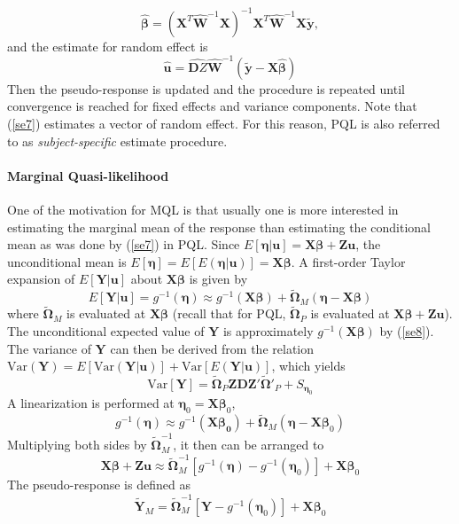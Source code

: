 		\begin{equation}
		\hat{\bm\beta} = (\bm X^T\hat{\bm W}^{-1} \bm X)^{-1}\bm X^T\hat{\bm W}^{-1}\bm X \tilde{\bm y},
		\end{equation}
		and the estimate for random effect is 
		\begin{equation}\label{se7}
		\hat{\bm u} = \hat{\bm DZ} \hat{\bm W}^{-1} (\tilde{\bm y}-\bm {X} \hat{\bm \beta})
		\end{equation}
		Then the pseudo-response is updated and the procedure is repeated until convergence is reached for fixed effects and variance components.  Note that (\ref{se7}) estimates a vector of random effect. For this reason, PQL is also referred to as \textit{subject-specific} estimate procedure. 
		
		\paragraph{Marginal Quasi-likelihood} 
		One of the motivation for MQL is that usually one is more interested in estimating the marginal mean of the response than estimating the conditional mean as was done by (\ref{se7}) in PQL. Since $E[\bm \eta|\bm u]= \bm {X\beta} + \bm {Zu}$, the unconditional mean is $E[\bm \eta] = E[E(\bm \eta|\bm u)]= \bm {X\beta}$. A first-order Taylor expansion of $E[\bm Y|\bm u]$ about $\bm X \bm\beta$ is given by 
		\begin{equation}\label{se8}
		E[\bm Y|\bm u] = g^{-1}(\bm \eta) \approx g^{-1} (\bm{X\beta}) + \tilde{\bm \Omega}_{M} (\bm \eta - \bm X\bm \beta)
		\end{equation}
		where $\tilde{\bm \Omega}_{M}$ is evaluated at $\bm {X\beta}$ (recall that for PQL, $\tilde{\bm \Omega}_P$ is evaluated at $\bm {X\beta} + \bm {Zu}$). The unconditional expected value of  $\bm Y$ is approximately $g^{-1}(\bm {X\beta})$ by (\ref{se8}). The variance of $\bm Y$ can then be derived from the relation $\text{Var}(\bm Y)= E[\text{Var}(\bm Y|\bm u)] + \text{Var}[E(\bm Y| \bm u)]$, which yields
		\begin{equation}\label{se9}
		\text{Var}[\bm Y] = \tilde{\bm \Omega}_P \bm {ZDZ'}\tilde{\bm \Omega}'_P + S_{\bm \eta_0}
		\end{equation}
		A linearization is performed at $\bm \eta_0= \bm X \bm \beta_0$, 
		\[ g^{-1}(\bm \eta) \approx g^{-1} (\bm{X\beta_0}) + \tilde{\bm \Omega}_{M} (\bm \eta - \bm X\bm \beta_0)\]
		Multiplying both sides by $\tilde{\bm \Omega}_{M} ^{-1}$, it then can be arranged to 
		\[\bm {X\beta} + \bm {Zu} \approx \tilde{\bm \Omega}_M^{-1}[g^{-1}(\bm\eta)- g^{-1}(\bm \eta_0)]  + \bm{X}\bm \beta_0 \]
		The pseudo-response is defined as 
		\begin{equation}\label{se10}
		\tilde{\bm Y}_M =  \tilde{\bm \Omega}_M^{-1}[\bm Y- g^{-1}(\bm \eta_0)]  + \bm{X}\bm \beta_0 
		\end{equation}
		
